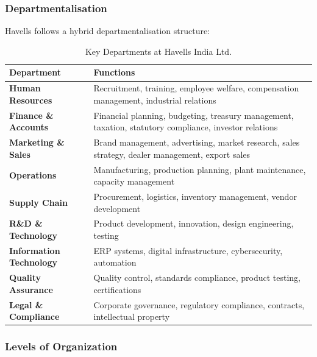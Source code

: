 \documentclass[12pt,a4paper]{article}
\begin{document}
\subsubsection{Departmentalisation}

Havells follows a hybrid departmentalisation structure:

\begin{table}[H]
    \centering
    \caption{Key Departments at Havells India Ltd.}
    \begin{tabularx}{\textwidth}{|l|X|}
        \hline
        \textbf{Department} & \textbf{Functions} \\
        \hline
        \textbf{Human Resources} & Recruitment, training, employee welfare, compensation management, industrial relations \\
        \hline
        \textbf{Finance \& Accounts} & Financial planning, budgeting, treasury management, taxation, statutory compliance, investor relations \\
        \hline
        \textbf{Marketing \& Sales} & Brand management, advertising, market research, sales strategy, dealer management, export sales \\
        \hline
        \textbf{Operations} & Manufacturing, production planning, plant maintenance, capacity management \\
        \hline
        \textbf{Supply Chain} & Procurement, logistics, inventory management, vendor development \\
        \hline
        \textbf{R\&D \& Technology} & Product development, innovation, design engineering, testing \\
        \hline
        \textbf{Information Technology} & ERP systems, digital infrastructure, cybersecurity, automation \\
        \hline
        \textbf{Quality Assurance} & Quality control, standards compliance, product testing, certifications \\
        \hline
        \textbf{Legal \& Compliance} & Corporate governance, regulatory compliance, contracts, intellectual property \\
        \hline
    \end{tabularx}
\end{table}

\subsubsection{Levels of Organization}
\end{document}
